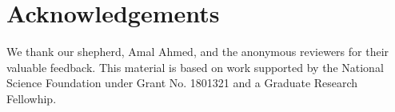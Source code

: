 \section*{Acknowledgements}

We thank our shepherd, Amal Ahmed, and the anonymous reviewers for their
valuable feedback. This material is based on work supported by the National
Science Foundation under Grant No. 1801321 and a Graduate Research Fellowhip.
